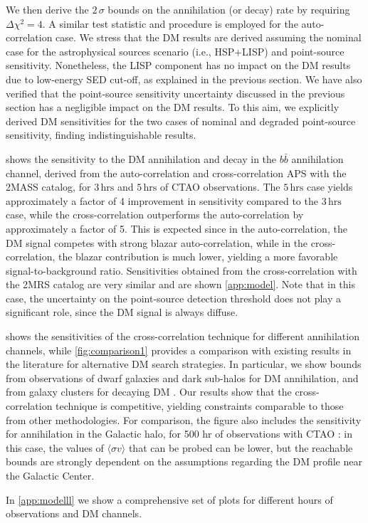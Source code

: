 We then derive the $2\,\sigma$ bounds on the annihilation (or decay)
rate by requiring $\varDelta \chi^2 = 4$. A similar test statistic and procedure is employed for the auto-correlation case.
We stress that the DM results are derived assuming the nominal case for the astrophysical sources scenario (i.e., HSP+LISP) and point-source sensitivity.
Nonetheless, the LISP component has no impact on the DM results due to low-energy SED cut-off, as explained in the previous section.
We have also verified that the point-source sensitivity uncertainty discussed in the previous section has a negligible impact on the DM results. To this aim, we explicitly derived DM sensitivities for the two cases of nominal and degraded point-source sensitivity, finding indistinguishable results.




 shows the sensitivity to the DM annihilation and decay in the $b\bar{b}$ annihilation channel, derived from the auto-correlation and cross-correlation APS with the  2MASS catalog, for $3\,\textrm{hrs}$ and $5\,\textrm{hrs}$ of CTAO observations. The $5\,\textrm{hrs}$ case yields approximately a factor of 4 improvement in sensitivity compared to the $3\,\textrm{hrs}$ case, while the cross-correlation outperforms the auto-correlation by approximately a factor of 5. This is expected since in the auto-correlation, the DM signal competes with strong blazar auto-correlation, while in the cross-correlation, the blazar contribution is much lower, yielding a more favorable signal-to-background ratio.
Sensitivities obtained from the cross-correlation with the 2MRS catalog are very similar and are shown {\cref{app:model}}.
Note that in this case, the uncertainty on the point-source detection threshold does not play a significant role, since the DM signal is always diffuse.

 shows the sensitivities of the cross-correlation technique for different annihilation channels, while \cref{fig:comparison1} provides a comparison with existing results in the literature for alternative DM search strategies. In particular, we show bounds from observations of dwarf galaxies \cite{CTAConsortium:2017dvg} and dark sub-halos \cite{Coronado_Blazquez_2021} for DM annihilation, and from galaxy clusters for decaying DM \cite{CTA2023,MAGIC_2018,Huang_2012,Cirelli_2012}. Our results show that the cross-correlation technique is competitive, yielding constraints comparable to those from other methodologies. For comparison, the figure also includes the sensitivity for annihilation in the Galactic halo, for 500 hr of observations with CTAO \cite{CTAConsortium:2017dvg}: in this case, the values of $\langle \sigma v \rangle$ that can be probed can be lower, but the reachable bounds are strongly dependent on the assumptions regarding the DM profile near the Galactic Center.

In {\cref{app:modelll}} we show a comprehensive set of plots for different hours of observations and DM channels. 




